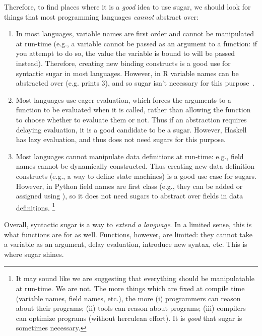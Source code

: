 Therefore, to find places where it is a \emph{good} idea to use sugar,
we should look for things that most programming languages
\emph{cannot} abstract over:
\begin{enumerate}
  \item In most languages, variable names are first order and cannot
    be manipulated at run-time (e.g., a variable cannot be passed as
    an argument to a function: if you attempt to do so, the value the
    variable is bound to will be passed instead). Therefore, creating
    new binding constructs is a good use for syntactic sugar in most
    languages. However, in R variable names can be abstracted
    over (e.g.  prints 3), and so sugar isn't
    necessary for this purpose~\cite{rlang}.
  \item Most languages use eager evaluation,
    which forces the arguments to a function to be
    evaluated when it is called, rather than allowing the function to
    choose whether to
    evaluate them or not. Thus if an abstraction requires delaying
    evaluation, it is a good candidate to be a sugar. However, Haskell
    has lazy evaluation, and thus does not need sugars for this purpose.
  \item Most languages cannot manipulate data definitions at run-time:
    e.g., field names cannot be dynamically constructed. Thus creating
    new data definition constructs (e.g., a way to define state
    machines) is a good use case for sugars. However, in Python field
    names are first class (e.g., they can be added or assigned using
    ), so it does not need sugars to abstract over fields
    in data definitions.%
    \footnote{
    It may sound like we are suggesting that everything should be
    manipulatable at run-time. We are not. The more
    things which are fixed at compile time (variable names, field
    names, etc.), the more (i) programmers can reason about their
    programs; (ii) tools can reason about programs; (iii) compilers
    can optimize programs (without herculean effort). It is
    \emph{good} that sugar is sometimes necessary.
  }
\end{enumerate}

Overall, syntactic sugar is a way to \emph{extend a language}.
In a limited sense, this is what functions are for as well.
Functions, however, are limited: they cannot take a variable as an
argument, delay evaluation, introduce new syntax, etc. This is where
sugar shines.


